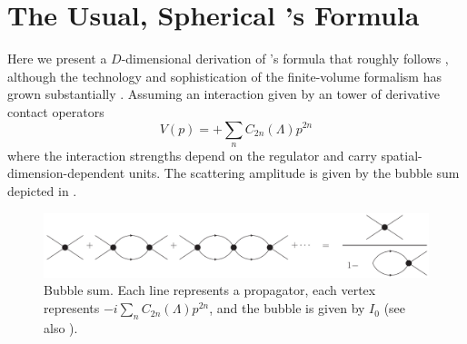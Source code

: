 \section{The Usual, Spherical \Luscher's Formula}\label{sec:spherical}


Here we present a $D$-dimensional derivation of \Luscher's formula that roughly follows , although the technology and sophistication of the finite-volume formalism has grown substantially .  Assuming an interaction given by an tower of derivative contact operators
\begin{equation}
    V(p) = +\sum_n C_{2n}(\Lambda) p^{2n}
\end{equation}
where the interaction strengths depend on the regulator and carry spatial-dimension-dependent units.
The scattering amplitude is given by the bubble sum depicted in .

\begin{figure}[ht!]
\center
\includegraphics[width=\columnwidth]{figure/bubbleSum.pdf}
\caption{Bubble sum. Each line represents a propagator, each vertex represents $-i \sum_n C_{2n}(\Lambda) p^{2n}$, and the bubble is given by $I_0$ (see also ).\label{fig:bubbleSum}}
\end{figure}

